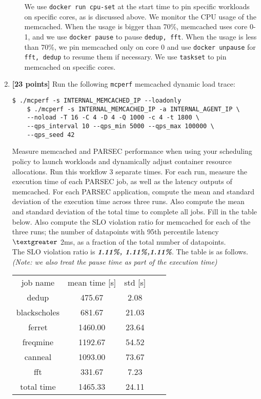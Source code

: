\documentclass[11pt]{article}
\begin{document}
\begin{enumerate}
\begin{itemize}
        We use \texttt{docker run cpu-set} at the start time to pin specific workloads on specific cores,
        as is discussed above.
        We monitor the CPU usage of the memcached. When the usage is bigger than 70\%, memcached uses core 0-1, and we use \texttt{docker pause}
        to pause \texttt{dedup, fft}. When the usage is less than 70\%, we pin memcached only on core 0 and use \texttt{docker unpause} for \texttt{fft, dedup} to resume them if necessary. 
        We use \texttt{taskset} to pin memcached on specific cores.
    \end{itemize}
    
    
    \item \textbf{[23 points]} Run the following \texttt{mcperf} memcached dynamic load trace: 
    
    \begin{Verbatim}[fontsize=\small]
        $ ./mcperf -s INTERNAL_MEMCACHED_IP --loadonly 
    $ ./mcperf -s INTERNAL_MEMCACHED_IP -a INTERNAL_AGENT_IP \ 
    --noload -T 16 -C 4 -D 4 -Q 1000 -c 4 -t 1800 \ 
    --qps_interval 10 --qps_min 5000 --qps_max 100000 \ 
    --qps_seed 42
\end{Verbatim}


Measure memcached and PARSEC performance when using your scheduling policy to launch workloads and dynamically adjust container resource allocations. Run this workflow 3 separate times. For each run, measure the execution time of each PARSEC job, as well as the latency outputs of memcached. For each PARSEC application, compute the mean and standard deviation of the execution time across three runs. Also compute the mean and standard deviation of the total time to complete all jobs. Fill in the table below.  Also compute the SLO violation ratio for memcached for each of the three runs; the number of datapoints with 95th percentile latency $\textgreater$ 2ms, as a fraction of the total number of datapoints.  \\

The SLO violation ratio is \emph{\textbf{1.11\%, 1.11\%,1.11\%}}. 
The table is as follows. \emph{(Note: we also treat the pause time as part of the  execution time)}

\begin{table}[h]
    \centering
    \begin{tabular}{ |c|c|c|c|c|} 
        \hline
        job name & mean time [s] & std [s] \\
        \hhline{|=|=|=|}
        dedup         & 475.67 & 2.08 \\  \hline
        blackscholes  & 681.67 & 21.03 \\  \hline
        ferret        & 1460.00 & 23.64 \\  \hline
        freqmine      & 1192.67 & 54.52 \\  \hline
        canneal       & 1093.00 & 73.67 \\  \hline
        fft           & 331.67 & 7.23 \\  \hline
        total time    & 1465.33 &  24.11 \\ \hline
        \end{tabular}
    \end{table}
    

\end{enumerate}
\end{document}
